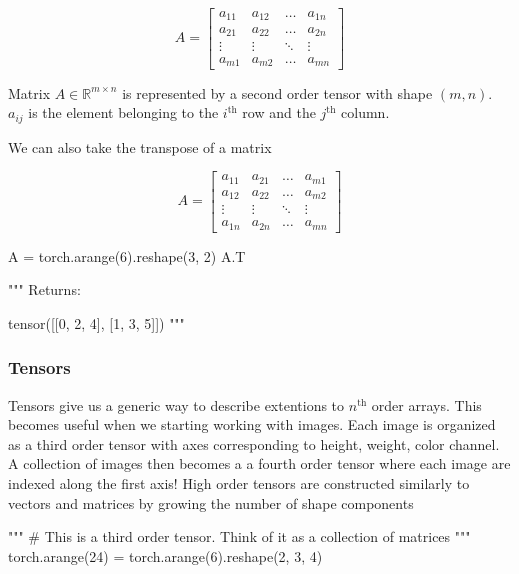 \documentclass[12pt]{article}
\begin{document}
$$
A = \begin{bmatrix}
  a_{11} & a_{12} & \hdots & a_{1n} \\
  a_{21} & a_{22} & \hdots & a_{2n} \\
  \vdots & \vdots & \ddots & \vdots \\
  a_{m1} & a_{m2} & \hdots & a_{mn}
\end{bmatrix}
$$

Matrix $A \in \mathbb{R}^{m \times n}$ is represented by a second order tensor with shape $(m, n)$.  $a_{ij}$ is the element belonging to the $i^{\text{th}}$ row and the $j^{\text{th}}$ column.

We can also take the transpose of a matrix

$$
A = \begin{bmatrix}
  a_{11} & a_{21} & \hdots & a_{m1} \\
  a_{12} & a_{22} & \hdots & a_{m2} \\
  \vdots & \vdots & \ddots & \vdots \\
  a_{1n} & a_{2n} & \hdots & a_{mn}
\end{bmatrix}
$$

\vspace{6pt}
\begin{python}
A = torch.arange(6).reshape(3, 2)
A.T

"""
Returns:

  tensor([[0, 2, 4],
    [1, 3, 5]])
"""
\end{python}
\vspace{6pt}

\subsubsection{Tensors}
Tensors give us a generic way to describe extentions to $n^{\text{th}}$ order arrays.  This becomes useful when we starting working with images.  Each image is organized as a third order tensor with axes corresponding to height, weight, color channel.  A collection of images then becomes a a fourth order tensor where each image are indexed along the first axis!  High order tensors are constructed similarly to vectors and matrices by growing the number of shape components

\vspace{6pt}
\begin{python}
"""
# This is a third order tensor.  Think of it as a collection of matrices
"""
torch.arange(24) = torch.arange(6).reshape(2, 3, 4)
\end{python}
\vspace{6pt}
\end{document}
